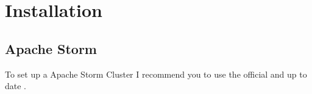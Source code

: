 \chapter{Installation}
\section{Apache Storm}
To set up a Apache Storm Cluster I recommend you to use the official and up to date .
